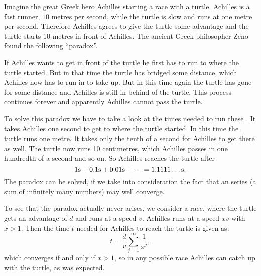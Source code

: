 \documentclass[12pt]{article}
\begin{document}
Imagine the great Greek hero Achilles starting a race with a turtle. Achilles is a fast runner,  $10$ metres per second, while the turtle is slow and runs at one metre per second. Therefore Achilles agrees to give the turtle some advantage and the turtle starts 10 metres in front of Achilles. The ancient Greek philosopher Zeno found the following ``paradox''.

If Achilles wants to get in front of the turtle he first has to run to where the turtle started. But in that time the turtle has bridged some distance, which Achilles now has to run in  to take up. But in this time again the turtle has gone for some distance and Achilles is still in behind of the turtle. This process continues forever and apparently Achilles cannot pass the turtle.

To solve this paradox we have to take a look at the times needed to run these . It takes Achilles one second to get to where the turtle started. In this time the turtle runs one metre. It takes only the tenth of a second for Achilles to get there as well. The turtle now runs 10 centimetres, which Achilles passes in one hundredth of a second and so on. So Achilles reaches the turtle after
$$1\rm{s}+0.1\rm{s}+0.01\rm{s}+\dots=1.1111\ldots\rm{s}.$$
The paradox can be solved, if we take into consideration the fact that an  series (a sum of infinitely many numbers) may well converge. 

To see that the paradox actually never arises, we consider a race, where the turtle gets an advantage of $d$ and runs at a speed $v$. Achilles runs at a speed $xv$ with $x>1$. Then the time $t$ needed for Achilles to reach the turtle is given as:
$$t=\frac{d}{v}\sum_{j=1}^\infty\frac{1}{x^j},$$
which converges if and only if $x>1$, so in any possible race Achilles can catch up with the turtle, as was expected.
\end{document}
